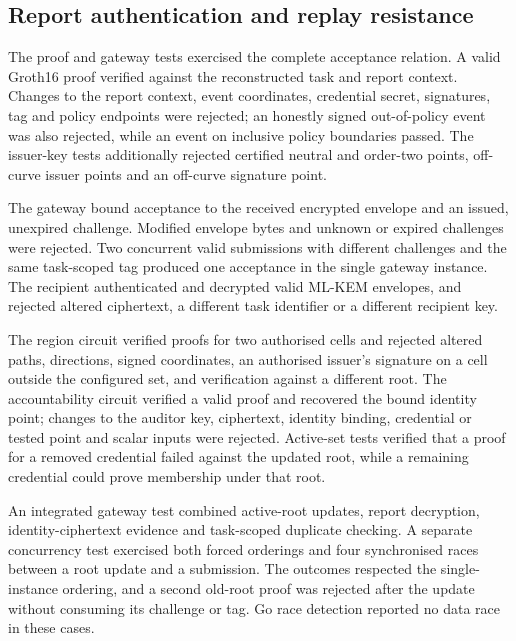 \documentclass[pdflatex,iicol,sn-mathphys-num]{sn-jnl}
\begin{document}
\subsection{Report authentication and replay resistance}
The proof and gateway tests exercised the complete acceptance relation. A valid Groth16 proof verified against the reconstructed task and report context. Changes to the report context, event coordinates, credential secret, signatures, tag and policy endpoints were rejected; an honestly signed out-of-policy event was also rejected, while an event on inclusive policy boundaries passed. The issuer-key tests additionally rejected certified neutral and order-two points, off-curve issuer points and an off-curve signature point.

The gateway bound acceptance to the received encrypted envelope and an issued, unexpired challenge. Modified envelope bytes and unknown or expired challenges were rejected. Two concurrent valid submissions with different challenges and the same task-scoped tag produced one acceptance in the single gateway instance. The recipient authenticated and decrypted valid ML-KEM envelopes, and rejected altered ciphertext, a different task identifier or a different recipient key.

The region circuit verified proofs for two authorised cells and rejected altered paths, directions, signed coordinates, an authorised issuer's signature on a cell outside the configured set, and verification against a different root. The accountability circuit verified a valid proof and recovered the bound identity point; changes to the auditor key, ciphertext, identity binding, credential or tested point and scalar inputs were rejected. Active-set tests verified that a proof for a removed credential failed against the updated root, while a remaining credential could prove membership under that root.

An integrated gateway test combined active-root updates, report decryption, identity-ciphertext evidence and task-scoped duplicate checking. A separate concurrency test exercised both forced orderings and four synchronised races between a root update and a submission. The outcomes respected the single-instance ordering, and a second old-root proof was rejected after the update without consuming its challenge or tag. Go race detection reported no data race in these cases.
\end{document}
